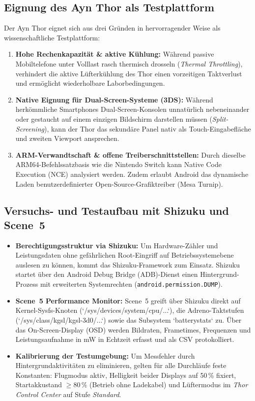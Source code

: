 \documentclass[12pt,a4paper]{scrartcl}
\begin{document}
\subsection{Eignung des Ayn Thor als Testplattform}
Der Ayn Thor eignet sich aus drei Gründen in hervorragender Weise als wissenschaftliche Testplattform:
\begin{enumerate}[leftmargin=1.8em]
    \item \textbf{Hohe Rechenkapazität \& aktive Kühlung:} Während passive Mobiltelefone unter Volllast rasch thermisch drosseln (\textit{Thermal Throttling}), verhindert die aktive Lüfterkühlung des Thor einen vorzeitigen Taktverlust und ermöglicht wiederholbare Laborbedingungen.
    \item \textbf{Native Eignung für Dual-Screen-Systeme (3DS):} Während herkömmliche Smartphones Dual-Screen-Konsolen unnatürlich nebeneinander oder gestaucht auf einem einzigen Bildschirm darstellen müssen (\textit{Split-Screening}), kann der Thor das sekundäre Panel nativ als Touch-Eingabefläche und zweiten Viewport ansprechen.
    \item \textbf{ARM-Verwandtschaft \& offene Treiberschnittstellen:} Durch dieselbe ARM64-Befehlssatzbasis wie die Nintendo Switch kann Native Code Execution (NCE) analysiert werden. Zudem erlaubt Android das dynamische Laden benutzerdefinierter Open-Source-Grafiktreiber (Mesa Turnip).
\end{enumerate}

\subsection{Versuchs- und Testaufbau mit Shizuku und Scene~5}
\begin{itemize}[leftmargin=1.8em]
    \item \textbf{Berechtigungsstruktur via Shizuku:} Um Hardware-Zähler und Leistungsdaten ohne gefährlichen Root-Eingriff auf Betriebssystemebene auslesen zu können, kommt das Shizuku-Framework zum Einsatz. Shizuku startet über den Android Debug Bridge (ADB)-Dienst einen Hintergrund-Prozess mit erweiterten Systemrechten (\texttt{android.permission.DUMP}).
    \item \textbf{Scene~5 Performance Monitor:} Scene~5 greift über Shizuku direkt auf Kernel-Sysfs-Knoten (`/sys/devices/system/cpu/...`), die Adreno-Taktstufen (`/sys/class/kgsl/kgsl-3d0/...`) sowie das Subsystem `batterystats` zu. Über das On-Screen-Display (OSD) werden Bildraten, Frametimes, Frequenzen und Leistungsaufnahme in mW in Echtzeit erfasst und als CSV protokolliert.
    \item \textbf{Kalibrierung der Testumgebung:} Um Messfehler durch Hintergrundaktivitäten zu eliminieren, gelten für alle Durchläufe feste Konstanten: Flugmodus aktiv, Helligkeit beider Displays auf 50\,\% fixiert, Startakkustand $\ge 80\,\%$ (Betrieb ohne Ladekabel) und Lüftermodus im \textit{Thor Control Center} auf Stufe \textit{Standard}.
\end{itemize}
\end{document}
